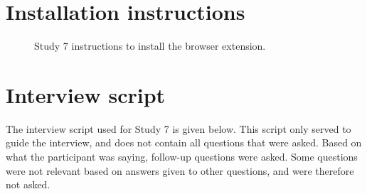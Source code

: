 \section{Installation instructions}
\begin{figure}[!htp] 
\caption[Study 7 installation instructions]{Study 7 instructions to install the browser extension.}
\label{fig:ch67-Study7Instructions}
\end{figure} 

\section{ Interview script}
The interview script used for Study 7 is given below. This script only served to guide the interview, and does not contain all questions that were asked.  Based on what the participant was saying, follow-up questions were asked. Some questions were not relevant based on answers given to other questions, and were therefore not asked.

